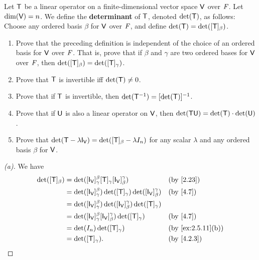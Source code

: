 \begin{ex}\label{ex:5.1.7}
	Let \(\mathsf{T}\) be a linear operator on a finite-dimensional vector space \(\mathsf{V}\) over \(\mathit{F}\).
	Let \(\dim(\mathsf{V}) = n\).
	We define the \textbf{determinant} of \(\mathsf{T}\), denoted \(\det(\mathsf{T})\), as follows:
	Choose any ordered basis \(\beta\) for \(\mathsf{V}\) over \(\mathit{F}\), and define \(\det(\mathsf{T}) = \det([\mathsf{T}]_{\beta})\).
	\begin{enumerate}
		\item Prove that the preceding definition is independent of the choice of an ordered basis for \(\mathsf{V}\) over \(\mathit{F}\).
		      That is, prove that if \(\beta\) and \(\gamma\) are two ordered bases for \(\mathsf{V}\) over \(\mathit{F}\), then \(\det([\mathsf{T}]_{\beta}) = \det([\mathsf{T}]_{\gamma})\).
		\item Prove that \(\mathsf{T}\) is invertible iff \(\det(\mathsf{T}) \neq 0\).
		\item Prove that if \(\mathsf{T}\) is invertible, then \(\det(\mathsf{T}^{-1}) = [\det(\mathsf{T})]^{-1}\).
		\item Prove that if \(\mathsf{U}\) is also a linear operator on \(\mathsf{V}\), then \(\det(\mathsf{T} \mathsf{U}) = \det(\mathsf{T}) \cdot \det(\mathsf{U})\).
		\item Prove that \(\det(\T - \lambda \IT[\V]) = \det([\T]_{\beta} - \lambda I_n)\) for any scalar \(\lambda\) and any ordered basis \(\beta\) for \(\mathsf{V}\).
	\end{enumerate}
\end{ex}

\begin{proof}[(a)]
	We have
	\begin{align*}
		\det([\T]_{\beta}) & = \det([\IT[\V]]_{\gamma}^{\beta} [\T]_{\gamma} [\IT[\V]]_{\beta}^{\gamma})             &  & \by{2.23}         \\
		                   & = \det([\IT[\V]]_{\gamma}^{\beta}) \det([\T]_{\gamma}) \det([\IT[\V]]_{\beta}^{\gamma}) &  & \by{4.7}          \\
		                   & = \det([\IT[\V]]_{\gamma}^{\beta}) \det([\IT[\V]]_{\beta}^{\gamma}) \det([\T]_{\gamma})                        \\
		                   & = \det([\IT[\V]]_{\gamma}^{\beta} [\IT[\V]]_{\beta}^{\gamma}) \det([\T]_{\gamma})       &  & \by{4.7}          \\
		                   & = \det(I_n) \det([\T]_{\gamma})                                                         &  & \by{ex:2.5.11}[b] \\
		                   & = \det([\T]_{\gamma}).                                                                  &  & \by{4.2.3}
	\end{align*}
\end{proof}

